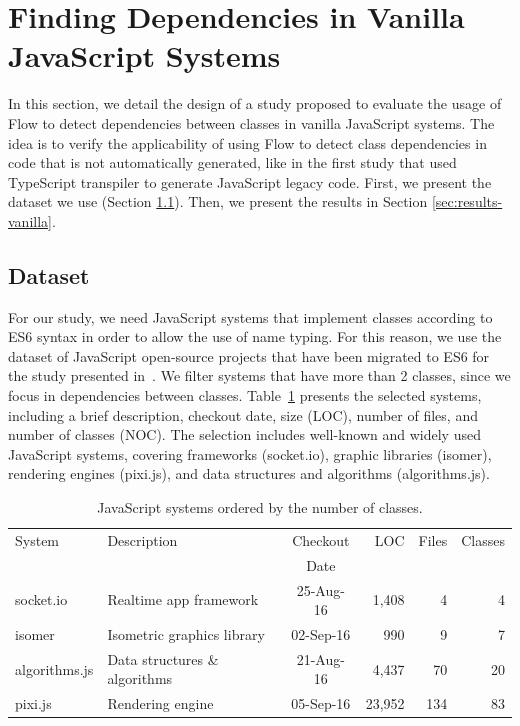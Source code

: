 \documentclass[review]{elsarticle}
\begin{document}
\section{Finding Dependencies in Vanilla JavaScript Systems}
\label{sec:study-design-vanilla}

In this section, we detail the design of a study proposed to evaluate the usage of Flow to detect dependencies between classes in vanilla JavaScript systems. The idea is to verify the applicability of using Flow to detect class dependencies in code that is not automatically generated, like in the first study that used TypeScript transpiler to generate JavaScript legacy code. First, we present the dataset we use (Section \ref{sec:dataset-vanilla}). Then, we present the results in Section \ref{sec:results-vanilla}.

\subsection{Dataset}
\label{sec:dataset-vanilla}

For our study, we need JavaScript systems that implement classes according to ES6 syntax in order to allow the use of name typing. For this reason, we use the dataset of JavaScript open-source projects that have been migrated to ES6 for the study presented in~\cite{icsr2017}. We filter systems that have more than 2 classes, since we focus in dependencies between classes. Table~\ref{tab:dataset-vanilla} presents the selected systems, including a brief description, checkout date, size (LOC), number of files, and number of classes (NOC). The selection includes well-known and widely used JavaScript systems, covering frameworks ({\sc socket.io}), graphic libraries ({\sc isomer}), rendering engines ({\sc pixi.js}), and data structures and algorithms ({\sc algorithms.js}). 

\begin{table}%
	\footnotesize
	\centering
	\caption{JavaScript systems ordered by the number of classes.}
	\begin{tabular}{llcrrr}
		\toprule
		System              & Description                    & Checkout  & LOC    & Files & Classes   \\
		&                                & Date      &        &          &                      \\
		\midrule
		{\sc socket.io}     & Realtime app framework         & 25-Aug-16 &  1,408 &      4 &        4    \\  
		{\sc isomer}        & Isometric graphics library     & 02-Sep-16 &    990 &      9 &        7   \\  
		{\sc algorithms.js} & Data structures \& algorithms  & 21-Aug-16 &  4,437 &     70 &       20   \\  
		{\sc pixi.js}       & Rendering engine               & 05-Sep-16 & 23,952 &    134 &       83   \\ 
		\bottomrule
	\end{tabular}
	\label{tab:dataset-vanilla}
\end{table}
\end{document}
